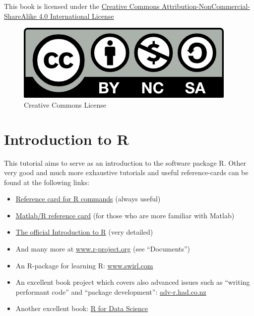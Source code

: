 \documentclass[
  14pt,
]{memoir}
\providecommand{\tightlist}{%
  \setlength{\itemsep}{0pt}\setlength{\parskip}{0pt}}
\begin{document}
This book is licensed under the \href{http://creativecommons.org/licenses/by-nc-sa/4.0/}{Creative Commons Attribution-NonCommercial-ShareAlike 4.0 International License}

\begin{figure}
\centering
\includegraphics{images/by-nc-sa.png}
\caption{Creative Commons License}
\end{figure}

\hypertarget{introduction-to-r}{%
\chapter{Introduction to R}\label{introduction-to-r}}

This tutorial aims to serve as an introduction to the software package R. Other very good and much more exhaustive tutorials and useful reference-cards can be found at the following links:

\begin{itemize}
\tightlist
\item
  \href{http://cran.r-project.org/doc/contrib/refcard.pdf}{Reference card for R commands} (always useful)
\item
  \href{http://www.math.umaine.edu/~hiebeler/comp/matlabR.pdf}{Matlab/R reference card} (for those who are more familiar with Matlab)
\item
  \href{https://cran.r-project.org/doc/manuals/r-release/R-intro.pdf}{The official Introduction to R} (very detailed)
\item
  And many more at \href{https://www.r-project.org/other-docs.html}{www.r-project.org} (see ``Documents'')
\item
  An R-package for learning R: \href{https://swirlstats.com/}{www.swirl.com}
\item
  An excellent book project which covers also advanced issues such as ``writing performant code'' and ``package development'': \href{http://adv-r.had.co.nz/}{adv-r.had.co.nz}\\
\item
  Another excellent book: \href{https://r4ds.had.co.nz/}{R for Data Science}
\end{itemize}
\end{document}
